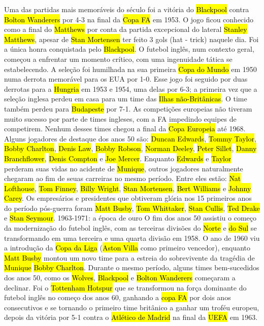 \documentclass[a4paper,12pt]{article}
\begin{document}
Uma das partidas mais memoráveis do século foi a vitória do \hl{Blackpool} contra \hl{Bolton Wanderers} por 4-3 na final da \hl{Copa FA} em 1953. O jogo ficou conhecido como a final do \hl{Matthews} por conta da partida excepcional do lateral \hl{Stanley Matthews}, apesar de \hl{Stan Mortensen} ter feito 3 gols (hat - trick) naquele dia. Foi a única honra conquistada pelo \hl{Blackpool}.
O futebol inglês, num contexto geral, começou a enfrentar um momento crítico, com uma ingenuidade tática se estabelecendo. A seleção foi humilhada na sua primeira \hl{Copa do Mundo} em 1950 numa derrota memorável para os EUA por 1-0. Esse jogo foi seguido por duas derrotas para a \hl{Hungria} em 1953 e 1954, uma delas por 6-3; a primeira vez que a seleção inglesa perdeu em casa para um time das \hl{Ilhas não-Britânicas}. O time também perdeu para \hl{Budapeste} por 7-1. As competições europeias não tiveram muito sucesso por parte de times ingleses, com a FA impedindo equipes de competirem. Nenhum desses times chegou a final da \hl{Copa Europeia} até 1968.
Alguns jogadores de destaque dos anos 50 são: \hl{Duncan Edwards}, \hl{Tommy Taylor}, \hl{Bobby Charlton}, \hl{Denis Law}, \hl{Bobby Robson}, \hl{Norman Deeley}, \hl{Peter Sillet}, \hl{Danny Branchflower}, \hl{Denis Compton} e \hl{Joe Mercer}.
Enquanto \hl{Edwards} e \hl{Taylor} perderam suas vidas no acidente de \hl{Munique}, outros jogadores naturalmente chegaram ao fim de seuas carreiras no mesmo período. Entre eles estão: \hl{Nat Lofthouse}, \hl{Tom Finney}, \hl{Billy Wright}, \hl{Stan Mortensen}, \hl{Bert Williams} e \hl{Johnny Carey}.
Os empresários e presidentes que obtiveram glória nos 15 primeiros anos do período pós-guerra foram \hl{Matt Busby}, \hl{Tom Whittaker}, \hl{Stan Cullis}, \hl{Ted Drake} e \hl{Stan Seymour}.
1963-1971: a época de ouro
O fim dos anos 50 assistiu o começo da modernização do futebol inglês, com as terceiras divisões do \hl{Norte} e \hl{do Sul} se transformando em uma terceira e uma quarta divisão em 1958. O ano de 1960 viu a introdução da \hl{Copa da Liga} (\hl{Aston Villa} como primeiro vencedor), enquanto \hl{Matt Busby} montou um novo time para a estreia do sobrevivente da tragédia de \hl{Munique} \hl{Bobby Charlton}. Durante o mesmo período, alguns times bem-sucedidos dos anos 50, como os \hl{Wolves}, \hl{Blackpool} e \hl{Bolton Wanderers} começaram a declinar.
Foi o \hl{Tottenham Hotspur} que se transformou na força dominante do futebol inglês no começo dos anos 60, ganhando a \hl{copa FA} por dois anos consecutivos e se tornando o primeiro time britânico a ganhar um troféu europeu, depois da vitória por 5-1 contra o \hl{Atlético de Madrid} na final da \hl{UEFA} em 1963.
\end{document}
